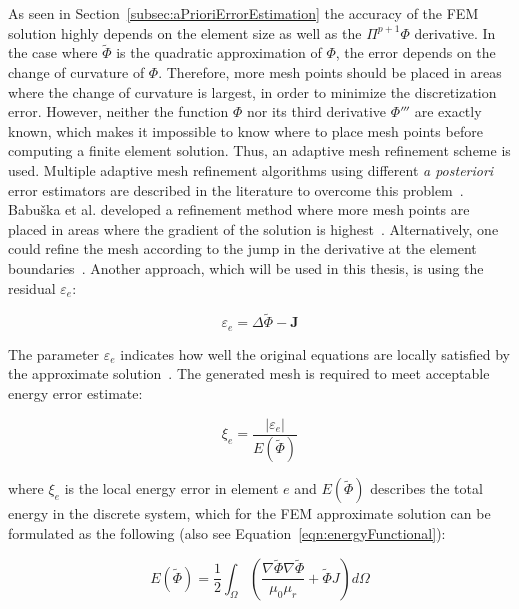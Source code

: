 As seen in Section~\ref{subsec:aPrioriErrorEstimation} the accuracy of the FEM solution highly depends on the element size as well as the $\Pi^{p+1}\Phi$ derivative. In the case where $\tilde{\Phi}$ is the quadratic approximation of $\Phi$, the error depends on the change of curvature of $\Phi$. Therefore, more mesh points should be placed in areas where the change of curvature is largest, in order to minimize the discretization error. However, neither the function $\Phi$ nor its third derivative $\Phi'''$ are exactly known, which makes it impossible to know where to place mesh points before computing a finite element solution. Thus, an adaptive mesh refinement scheme is used. Multiple adaptive mesh refinement algorithms using different \emph{a posteriori} error estimators are described in the literature to overcome this problem~\cite{Ainsworth2011,Verfurth1994,Verfurth2013}. Babu\v{s}ka et al. developed a refinement method where more mesh points are placed in areas where the gradient of the solution is highest~\cite{Babuska1978,Babuska1978_2,Babuska1979,Babuska1981}. Alternatively, one could refine the mesh according to the jump in the derivative at the element boundaries~\cite{Zienkiewicz1987}. Another approach, which will be used in this thesis, is using the residual $\varepsilon_{e}$:

\begin{equation}
	\varepsilon_{e} = \Delta \tilde{\Phi} - \mathbf{J}
\end{equation}

The parameter $\varepsilon_{e}$ indicates how well the original equations are locally satisfied by the approximate solution~\cite{Zienkiewicz1983}. The generated mesh is required to meet acceptable energy error estimate:

\begin{equation}
	\xi_{e} = \frac{|\varepsilon_{e}|}{E(\tilde{\Phi})}
	\label{eqn:localPercentEnergyErrorEstimate}
\end{equation}

where $\xi_{e}$ is the local energy error in element $e$ and $E(\tilde{\Phi})$ describes the total energy in the discrete system, which for the FEM approximate solution can be formulated as the following (also see Equation~\ref{eqn:energyFunctional}):

\begin{equation}
	E(\tilde{\Phi}) = \frac{1}{2}\int_{\Omega}\left(\frac{\nabla \tilde{\Phi}\nabla \tilde{\Phi}}{\mu_{0}\mu_{r}}+\tilde{\Phi} J \right)d\Omega
	\label{eqn:totalEnergy}
\end{equation}

